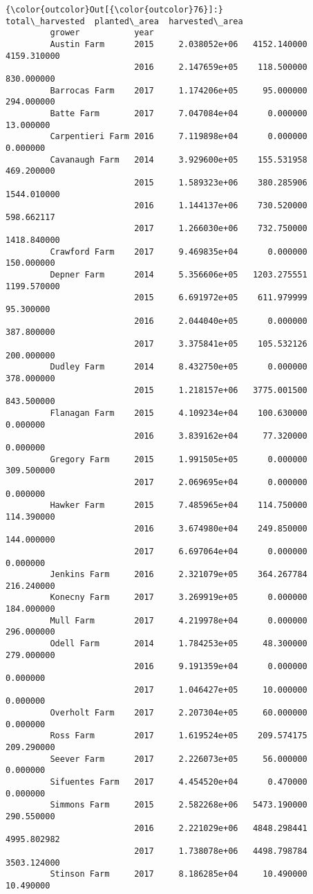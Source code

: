 \documentclass[11pt]{article}
\begin{document}
\begin{Verbatim}[commandchars=\\\{\}]
{\color{outcolor}Out[{\color{outcolor}76}]:}                        total\_harvested  planted\_area  harvested\_area
         grower           year                                               
         Austin Farm      2015     2.038052e+06   4152.140000     4159.310000
                          2016     2.147659e+05    118.500000      830.000000
         Barrocas Farm    2017     1.174206e+05     95.000000      294.000000
         Batte Farm       2017     7.047084e+04      0.000000       13.000000
         Carpentieri Farm 2016     7.119898e+04      0.000000        0.000000
         Cavanaugh Farm   2014     3.929600e+05    155.531958      469.200000
                          2015     1.589323e+06    380.285906     1544.010000
                          2016     1.144137e+06    730.520000      598.662117
                          2017     1.266030e+06    732.750000     1418.840000
         Crawford Farm    2017     9.469835e+04      0.000000      150.000000
         Depner Farm      2014     5.356606e+05   1203.275551     1199.570000
                          2015     6.691972e+05    611.979999       95.300000
                          2016     2.044040e+05      0.000000      387.800000
                          2017     3.375841e+05    105.532126      200.000000
         Dudley Farm      2014     8.432750e+05      0.000000      378.000000
                          2015     1.218157e+06   3775.001500      843.500000
         Flanagan Farm    2015     4.109234e+04    100.630000        0.000000
                          2016     3.839162e+04     77.320000        0.000000
         Gregory Farm     2015     1.991505e+05      0.000000      309.500000
                          2017     2.069695e+04      0.000000        0.000000
         Hawker Farm      2015     7.485965e+04    114.750000      114.390000
                          2016     3.674980e+04    249.850000      144.000000
                          2017     6.697064e+04      0.000000        0.000000
         Jenkins Farm     2016     2.321079e+05    364.267784      216.240000
         Konecny Farm     2017     3.269919e+05      0.000000      184.000000
         Mull Farm        2017     4.219978e+04      0.000000      296.000000
         Odell Farm       2014     1.784253e+05     48.300000      279.000000
                          2016     9.191359e+04      0.000000        0.000000
                          2017     1.046427e+05     10.000000        0.000000
         Overholt Farm    2017     2.207304e+05     60.000000        0.000000
         Ross Farm        2017     1.619524e+05    209.574175      209.290000
         Seever Farm      2017     2.226073e+05     56.000000        0.000000
         Sifuentes Farm   2017     4.454520e+04      0.470000        0.000000
         Simmons Farm     2015     2.582268e+06   5473.190000      290.550000
                          2016     2.221029e+06   4848.298441     4995.802982
                          2017     1.738078e+06   4498.798784     3503.124000
         Stinson Farm     2017     8.186285e+04     10.490000       10.490000
\end{Verbatim}
            

    
    
    
    
\end{document}
